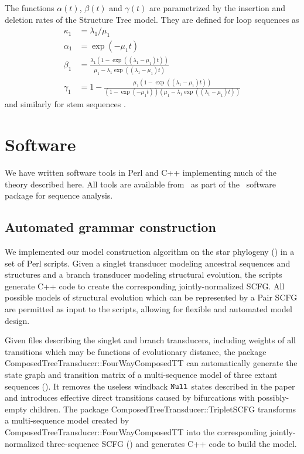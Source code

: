 \documentclass[10pt]{article}
\begin{document}
The functions $\alpha(t)$, $\beta(t)$ and $\gamma(t)$ are parametrized by the insertion and deletion rates of the Structure Tree model.
They are defined for loop sequences as
\begin{align}
  \kappa_1 &= \lambda_1 / \mu_1 \\
  \alpha_1 &= \exp \left( -\mu_1 t \right) \\
  \beta_1 &= \frac{\lambda_1 \left( 1 - \exp \left((\lambda_1 - \mu_1) t \right) \right)}{\mu_1 - \lambda_1 \exp \left( (\lambda_1 - \mu_1) t \right) } \\
  \gamma_1 &= 1 - \frac{\mu_1 \left( 1 - \exp \left((\lambda_1 - \mu_1) t \right) \right)}{\left( 1 - \exp (- \mu_1 t) \right) \left(\mu_1 - \lambda_1 \exp \left( (\lambda_1 - \mu_1) t \right) \right) }
\end{align}
and similarly for stem sequences \cite{Holmes2004}.


\newpage


\newpage
\section{Software}

We have written software tools in Perl and C++ implementing much of the theory described here.
All tools are available from \darturl\ as part of the \dart\ software package for sequence analysis.

\subsection{Automated grammar construction}
We implemented our model construction algorithm on the star phylogeny () 
in a set of Perl scripts.
Given a singlet transducer modeling ancestral sequences and structures and
a branch transducer modeling structural evolution,
the scripts generate C++ code to create the corresponding jointly-normalized SCFG.
All possible models of structural evolution which can be represented by a Pair SCFG
are permitted as input to the scripts,
allowing for flexible and automated model design.

Given files describing the singlet and branch transducers,
including weights of all transitions which may be functions of evolutionary distance,
the package ComposedTreeTransducer::FourWayComposedTT can automatically generate
the state graph and transition matrix of a multi-sequence model of three extant sequences
().
It removes the useless windback $\mathtt{Null}$ states described in the paper and
introduces effective direct transitions caused by bifurcations with possibly-empty children.
The package ComposedTreeTransducer::TripletSCFG transforms a multi-sequence
model created by ComposedTreeTransducer::FourWayComposedTT into the 
corresponding jointly-normalized three-sequence SCFG ()
and generates C++ code to build the model.
\end{document}
